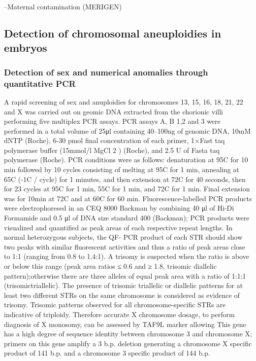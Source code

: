 --Maternal contamination (MERIGEN) 

\subsection*{Detection of chromosomal aneuploidies in embryos} 
\subsubsection*{Detection of sex and numerical anomalies through quantitative PCR}
A rapid screening of sex and anuploidies for chromosomes 13, 15, 16, 18, 21, 22 and X was carried out on geomic DNA extracted from the chorionic villi performing five multiplex PCR assays. PCR assays A, B 1,2 and 3 were performed in a total volume of 25μl containing 40–100ng of genomic DNA, 10mM dNTP (Roche), 6-30 pmol final concentration of each primer, 1×Fast taq polymerase buffer (15mmol/l MgCl 2 ) (Roche), and 2.5 U of Fasta taq polymerase (Roche). PCR conditions were as follows: denaturation at 95\textdegree C for 10 min followed by 10 cycles consisting of melting at 95\textdegree C for 1 min, annealing at 65\textdegree C (-1\textdegree C / cycle) for 1 minutes, and then extension at 72\textdegree C for 40 seconds, then for 23 cycles at 95\textdegree C for 1 min, 55\textdegree C for 1 min, and 72\textdegree C for 1 min. Final extension was for 10min at 72\textdegree C and at 60\textdegree C for 60 min. Fluorescence-labelled PCR products were electrophoresed in an CEQ 8000 Backman by combining 40 μl of Hi-Di Formamide and 0.5 μl of DNA size standard 400 (Backman); PCR products were visualized and quantified as peak areas of each respective repeat lengths. In normal heterozygous subjects, the QF- PCR product of each STR should show two peaks with similar fluorescent activities and thus a ratio of peak areas close to 1:1 (ranging from 0.8 to 1.4:1). A trisomy is suspected when the ratio is  above or below this range (peak area ratios ≤ 0.6 and ≥ 1.8, trisomic diallelic pattern);otherwise there are three alleles of equal peak area with a ratio of 1:1:1 (trisomictriallelic). The presence of trisomic triallelic or diallelic patterns for at least two different STRs on the same chromosome is considered as evidence of trisomy. Trisomic patterns observed for all chromosome-specific STRs are indicative of triploidy. Therefore accurate X chromosome dosage, to perform diagnosis of X monosomy, can be assessed by TAF9L marker allowing This gene has a high degree of sequence identity between chromosome 3 and chromosome X; primers on this gene amplify a 3 b.p. deletion generating a chromosome X specific product of 141 b.p. and a chromosome 3 specific product of 144 b.p.

